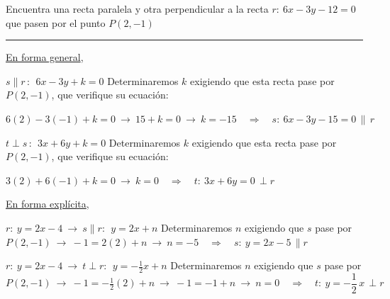 \vspace{5mm}

\begin{miejercicio}

Encuentra una recta paralela y otra perpendicular a la recta $r:\ 6x-3y-12=0	$ que pasen por el punto $P(2,-1)$

\rule{250pt}{0.1pt}

\vspace{2mm} \underline{En forma general}, 

\vspace{2mm} $s\parallel r \, : \ \ 6x-3y+k=0$ Determinaremos $k$ exigiendo que esta recta pase por $P(2,-1)$, que verifique su ecuación:

\vspace{2mm} $6(2)-3(-1)+k=0 \ \to \ 15+k=0 \ \to \ k=-15 \quad \Rightarrow \quad s:\ 6x-3y-15=0 \, \parallel \, r$

\vspace{4mm} $t\perp s \, : \ \ 3x+6y+k=0$ Determinaremos $k$ exigiendo que esta recta pase por $P(2,-1)$, que verifique su ecuación:

\vspace{2mm} $3(2)+6(-1)+k=0 \ \to \ k=0 \quad \Rightarrow \quad t:\ 3x+6y=0 \, \perp r$

\vspace{8mm}  \underline{En forma explícita},

\vspace{2mm} $r:\ y=2x-4 \ \to \ s \parallel r:\ \ y=2x+n$ Determinaremos $n$ exigiendo que $s$ pase por $P(2,-1) \ \to \ -1=2(2)+n \ \to \ n=-5 \quad \Rightarrow \quad s:\ y=2x-5 \, \parallel r$

\vspace{4mm} $r:\ y=2x-4 \ \to \ t \perp r:\ \ y=-\frac 12x+n$ Determinaremos $n$ exigiendo que $s$ pase por $P(2,-1) \ \to \ -1=-\frac 1 2(2)+n \ \to \ -1=-1+n \ \to \  n=0 \quad \Rightarrow \quad t:\ y=-\dfrac 1 2\, x \, \perp r$
\end{miejercicio}


